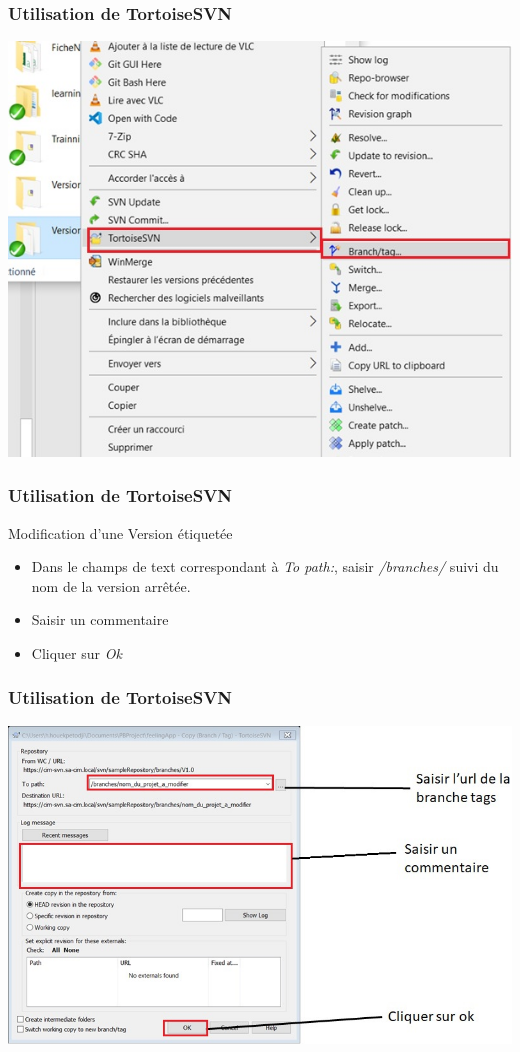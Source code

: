 \documentclass{beamer}
\begin{document}
\begin{frame}
\frametitle{Utilisation de TortoiseSVN}
\includegraphics[scale=.7]{../images/etiquetage1.jpg}
\end{frame}

\begin{frame}
\frametitle{Utilisation de TortoiseSVN}
\begin{block}{Modification d'une Version étiquetée}
\begin{itemize}
\item Dans le champs de text correspondant à \alert{\textit{To path:}}, saisir \alert{\textit{/branches/}} suivi du nom de la version arrêtée.
\item Saisir un commentaire
\item Cliquer sur \alert{\textit{Ok}}
\end{itemize}
\end{block}
\end{frame}

\begin{frame}
\frametitle{Utilisation de TortoiseSVN}
\includegraphics[scale=.7]{../images/etiquetage3.jpg}
\end{frame}
\end{document}
